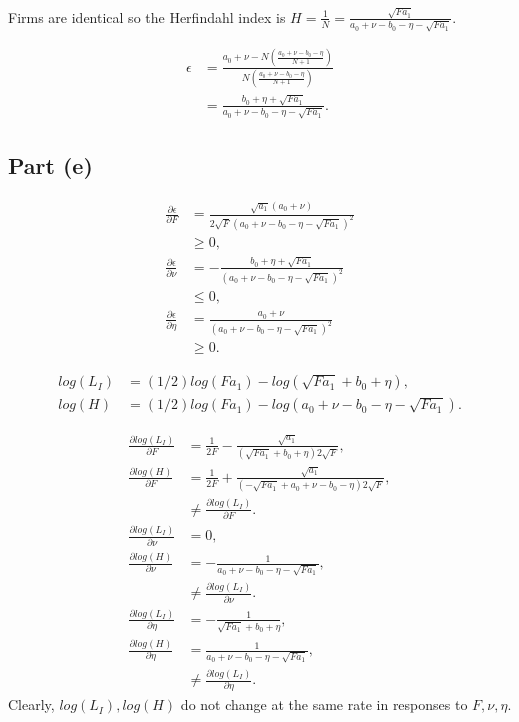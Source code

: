 \documentclass[11pt]{article} %
\begin{document}
Firms are identical so the Herfindahl index is $H=\frac{1}{N} = \frac{\sqrt{F a_1}}{a_0 + \nu - b_0 - \eta - \sqrt{F a_1}}$.

\begin{align*}
\epsilon &= \frac{a_0 + \nu - N\left( \frac{a_0 + \nu - b_0 - \eta}{N+1}\right)}{ N\left( \frac{a_0 + \nu - b_0 - \eta}{N+1}\right)} \\
&= \frac{b_0 + \eta + \sqrt{Fa_1}}{a_0 + \nu - b_0 - \eta - \sqrt{Fa_1}}.
\end{align*}

\subsection{Part (e)}
\begin{align*}
\frac{\partial \epsilon}{\partial F} &= \frac{\sqrt{a_1}(a_0 + \nu)}{2\sqrt{F}(a_0 + \nu - b_0 - \eta - \sqrt{Fa_1})^2} \\
& \geq 0, \\
\frac{\partial \epsilon}{\partial \nu} &= -\frac{b_0 + \eta + \sqrt{Fa_1}}{(a_0 + \nu - b_0 - \eta - \sqrt{Fa_1})^2}\\
& \leq 0, \\
\frac{\partial \epsilon}{\partial \eta} &= \frac{a_0 + \nu}{(a_0 + \nu - b_0 - \eta - \sqrt{Fa_1})^2} \\
& \geq 0.
\end{align*}

\begin{align*}
log(L_I) &= (1/2)log(Fa_1) - log(\sqrt{Fa_1} + b_0 + \eta),\\
log(H) &= (1/2)log(Fa_1) - log(a_0 + \nu - b_0 - \eta - \sqrt{Fa_1}).
\end{align*}

\begin{align*}
\frac{\partial log(L_I)}{\partial F} &= \frac{1}{2F} - \frac{\sqrt{a_1}}{(\sqrt{Fa_1} + b_0 + \eta)2\sqrt{F}},\\
\frac{\partial log(H)}{\partial F} &= \frac{1}{2F} + \frac{\sqrt{a_1}}{(-\sqrt{Fa_1} + a_0 + \nu - b_0 - \eta)2\sqrt{F}} ,\\
&\neq \frac{\partial log(L_I)}{\partial F}. \\
\frac{\partial log(L_I)}{\partial \nu} &= 0, \\
\frac{\partial log(H)}{\partial \nu} &= -\frac{1}{a_0 + \nu - b_0 - \eta - \sqrt{Fa_1}}, \\
&\neq \frac{\partial log(L_I)}{\partial \nu}. \\
\frac{\partial log(L_I)}{\partial \eta} &= -\frac{1}{\sqrt{Fa_1} + b_0 + \eta}, \\
\frac{\partial log(H)}{\partial \eta} &= \frac{1}{a_0 + \nu - b_0 - \eta - \sqrt{Fa_1}}, \\
&\neq \frac{\partial log(L_I)}{\partial \eta}. 
\end{align*}
Clearly, $log(L_I),log(H)$ do not change at the same rate in responses to $F,\nu,\eta$.
\end{document}
